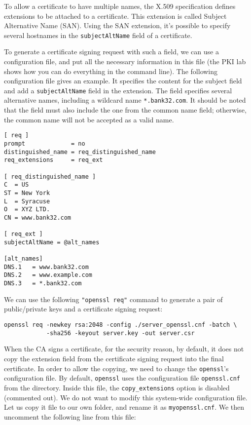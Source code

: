 To allow a certificate to have multiple names, 
the X.509 specification defines extensions to be attached to a certificate.
This extension is called Subject Alternative Name (SAN).
Using the SAN extension, it’s possible
to specify several hostnames in the \texttt{subjectAltName} field of a certificate.

To generate a certificate signing request with such a field, we can 
use a configuration file, and put all the necessary information in this file (the PKI
lab shows how you can do everything in the command line).  
The following configuration file gives an example. It specifies 
the content for the subject field and add a 
\texttt{subjectAltName} field in the extension. The field specifies 
several alternative names, including a wildcard name \texttt{*.bank32.com}.  
It should be noted that the field must also
include the one from the common name field;
otherwise, the common name will not be accepted as a valid name.


\begin{lstlisting}[caption={\texttt{server\_openssl.cnf}}]
[ req ]
prompt             = no
distinguished_name = req_distinguished_name
req_extensions     = req_ext

[ req_distinguished_name ]
C  = US
ST = New York
L  = Syracuse
O  = XYZ LTD.
CN = www.bank32.com

[ req_ext ]
subjectAltName = @alt_names

[alt_names]
DNS.1   = www.bank32.com
DNS.2   = www.example.com
DNS.3   = *.bank32.com
\end{lstlisting}

We can use the following \texttt{"openssl req"} command to generate 
a pair of public/private keys and a certificate signing request:

\begin{lstlisting}
openssl req -newkey rsa:2048 -config ./server_openssl.cnf -batch \
            -sha256 -keyout server.key -out server.csr 
\end{lstlisting}


When the CA signs a certificate, for the security reason, by default, it does not 
copy the extension field from the certificate signing request into
the final certificate. In order to allow the copying, we 
need to change the \texttt{openssl}'s configuration file.  
By default, \texttt{openssl} uses the configuration
file \texttt{openssl.cnf} from the  directory. 
Inside this file, the \texttt{copy\_extensions}
option is disabled (commented out). We do not want to modify
this system-wide configuration file. Let us
copy it file to our own folder, and rename it as \texttt{myopenssl.cnf}.
We then uncomment the following line from this file: 

